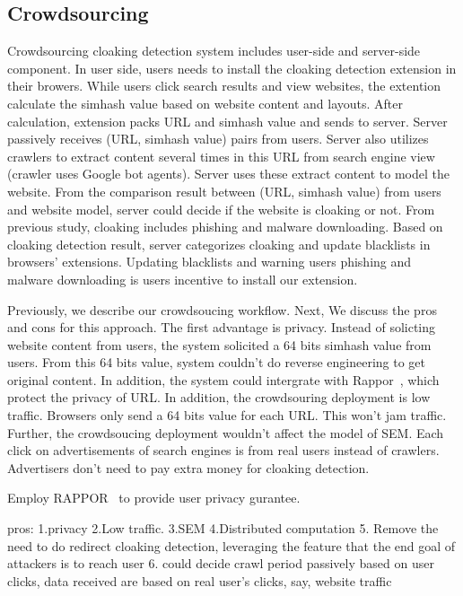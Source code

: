 \subsection{Crowdsourcing}
Crowdsourcing cloaking detection system includes user-side and server-side component. In user side, users needs to install the cloaking
detection extension in their browers. While users click search results and view websites, the extention calculate the simhash value based on 
website content and layouts. After calculation, extension packs URL and simhash value and sends to server. Server passively receives (URL, simhash value)
 pairs from users. Server also utilizes crawlers to extract content several times in this URL from search engine view (crawler uses Google bot agents).
 Server uses these extract content to model the website. From the comparison result between (URL, simhash value) from users and website model,
 server could decide if the website is cloaking or not. From previous study, cloaking includes phishing and malware downloading. Based on cloaking
 detection result, server categorizes cloaking and update blacklists in browsers' extensions. Updating blacklists and warning users phishing and
 malware downloading is users incentive to install our extension. 

 Previously, we describe our crowdsoucing workflow. Next, We discuss the pros and cons for this approach. The first advantage is privacy. Instead of solicting
 website content from users, the system solicited a 64 bits simhash value from users. From this 64 bits value, system couldn't do reverse engineering to
 get original content. In addition, the system could intergrate with Rappor~\cite{erlingsson2014rappor}, which protect the privacy of URL.
 In addition, the crowdsouring deployment is low traffic. Browsers only  send a 64 bits value for
 each URL. This won't jam traffic. Further, the crowdsoucing deployment wouldn't affect the model of SEM. Each click on advertisements of search engines is
 from real users instead of crawlers. Advertisers don't need to pay extra money for cloaking detection. 


Employ RAPPOR~\cite{erlingsson2014rappor} to provide user privacy gurantee.

pros: 	1.privacy 2.Low traffic. 3.SEM 4.Distributed computation 
5. Remove the need to do redirect cloaking detection, leveraging the feature
that the end goal of attackers is to reach user
6. could decide crawl period passively based on user clicks, data received are
based on real user’s clicks, say, website traffic

